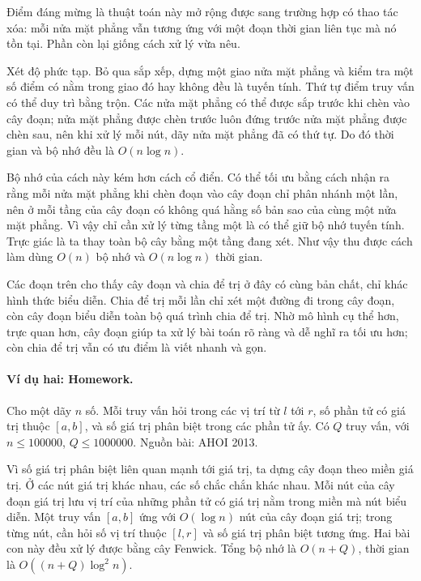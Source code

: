 \documentclass[11pt]{article}
\begin{document}
Điểm đáng mừng là thuật toán này mở rộng được sang trường hợp có thao tác xóa:
mỗi nửa mặt phẳng vẫn tương ứng với một đoạn thời gian liên tục mà nó tồn tại.
Phần còn lại giống cách xử lý vừa nêu.

Xét độ phức tạp. Bỏ qua sắp xếp, dựng một giao nửa mặt phẳng và kiểm tra một
số điểm có nằm trong giao đó hay không đều là tuyến tính. Thứ tự điểm truy vấn
có thể duy trì bằng trộn. Các nửa mặt phẳng có thể được sắp trước khi chèn vào
cây đoạn; nửa mặt phẳng được chèn trước luôn đứng trước nửa mặt phẳng được
chèn sau, nên khi xử lý mỗi nút, dãy nửa mặt phẳng đã có thứ tự. Do đó thời
gian và bộ nhớ đều là \(O(n\log n)\).

Bộ nhớ của cách này kém hơn cách cổ điển. Có thể tối ưu bằng cách nhận ra rằng
mỗi nửa mặt phẳng khi chèn đoạn vào cây đoạn chỉ phân nhánh một lần, nên ở mỗi
tầng của cây đoạn có không quá hằng số bản sao của cùng một nửa mặt phẳng. Vì
vậy chỉ cần xử lý từng tầng một là có thể giữ bộ nhớ tuyến tính. Trực giác là
ta thay toàn bộ cây bằng một tầng đang xét. Như vậy thu được cách làm dùng
\(O(n)\) bộ nhớ và \(O(n\log n)\) thời gian.

Các đoạn trên cho thấy cây đoạn và chia để trị ở đây có cùng bản chất, chỉ
khác hình thức biểu diễn. Chia để trị mỗi lần chỉ xét một đường đi trong cây
đoạn, còn cây đoạn biểu diễn toàn bộ quá trình chia để trị. Nhờ mô hình cụ thể
hơn, trực quan hơn, cây đoạn giúp ta xử lý bài toán rõ ràng và dễ nghĩ ra tối
ưu hơn; còn chia để trị vẫn có ưu điểm là viết nhanh và gọn.

\paragraph{Ví dụ hai: Homework.}
Cho một dãy \(n\) số. Mỗi truy vấn hỏi trong các vị trí từ \(l\) tới \(r\), số
phần tử có giá trị thuộc \([a,b]\), và số giá trị phân biệt trong các phần tử
ấy. Có \(Q\) truy vấn, với \(n\le 100000\), \(Q\le 1000000\). Nguồn bài: AHOI
2013.

Vì số giá trị phân biệt liên quan mạnh tới giá trị, ta dựng cây đoạn theo miền
giá trị. Ở các nút giá trị khác nhau, các số chắc chắn khác nhau. Mỗi nút của
cây đoạn giá trị lưu vị trí của những phần tử có giá trị nằm trong miền mà nút
biểu diễn. Một truy vấn \([a,b]\) ứng với \(O(\log n)\) nút của cây đoạn giá
trị; trong từng nút, cần hỏi số vị trí thuộc \([l,r]\) và số giá trị phân biệt
tương ứng. Hai bài con này đều xử lý được bằng cây Fenwick. Tổng bộ nhớ là
\(O(n+Q)\), thời gian là \(O((n+Q)\log^2 n)\).
\end{document}
